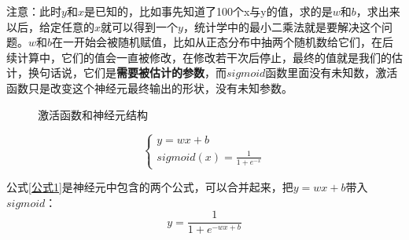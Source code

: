 \documentclass[a5paper, 11pt]{ctexbook}
\begin{document}
注意：此时$y$和$x$是已知的，比如事先知道了100个x与y的值，求的是$w$和$b$，求出来以后，给定任意的$x$就可以得到一个$y$，统计学中的最小二乘法就是要解决这个问题。$w$和$b$在一开始会被随机赋值，比如从正态分布中抽两个随机数给它们，在后续计算中，它们的值会一直被修改，在修改若干次后停止，最终的值就是我们的估计，换句话说，它们是\textbf{需要被估计的参数}，而$sigmoid$函数里面没有未知数，激活函数只是改变这个神经元最终输出的形状，没有未知参数。

\begin{figure}[ht]
    \centering
    \caption{激活函数和神经元结构}
    \label{figure1}
\end{figure}

\begin{equation}
    \begin{cases}\label{公式1}
        y=wx+b \\
        sigmoid(x) = \frac{1}{1+e^{-x}}
    \end{cases}
\end{equation}

公式\ref{公式1}是神经元中包含的两个公式，可以合并起来，把$y=wx+b$带入$sigmoid$：
\begin{equation}\label{sig_y}
    y = \frac{1}{1+e^{-wx+b}}
\end{equation}
\end{document}
